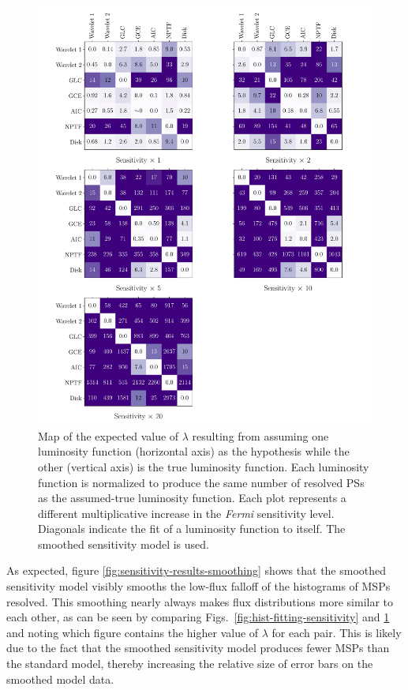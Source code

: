 \documentclass[letter,11pt]{article}
\begin{document}
\begin{figure}
    \centering
    \includegraphics[height=0.8\textheight]{figs/hist-unbinned-sensitivity-smoothing.pdf}
    \caption{Map of the expected value of $\lambda$ resulting from assuming one luminosity function (horizontal axis) as the hypothesis while the other (vertical axis) is the true luminosity function. Each luminosity function is normalized to produce the same number of resolved PSs as the assumed-true luminosity function. Each plot represents a different multiplicative increase in the \textit{Fermi} sensitivity level. Diagonals indicate the fit of a luminosity function to itself. The smoothed sensitivity model is used.}
    \label{fig:hist-unbinned-sensitivity-smoothing}
\end{figure}

As expected, figure \ref{fig:sensitivity-results-smoothing} shows that the smoothed sensitivity model visibly smooths the low-flux falloff of the histograms of MSPs resolved. This smoothing nearly always makes flux distributions more similar to each other, as can be seen by comparing Figs.~\ref{fig:hist-fitting-sensitivity} and \ref{fig:hist-unbinned-sensitivity-smoothing} and noting which figure contains the higher value of $\lambda$ for each pair. This is likely due to the fact that the smoothed sensitivity model produces fewer MSPs than the standard model, thereby increasing the relative size of error bars on the smoothed model data.
\end{document}
